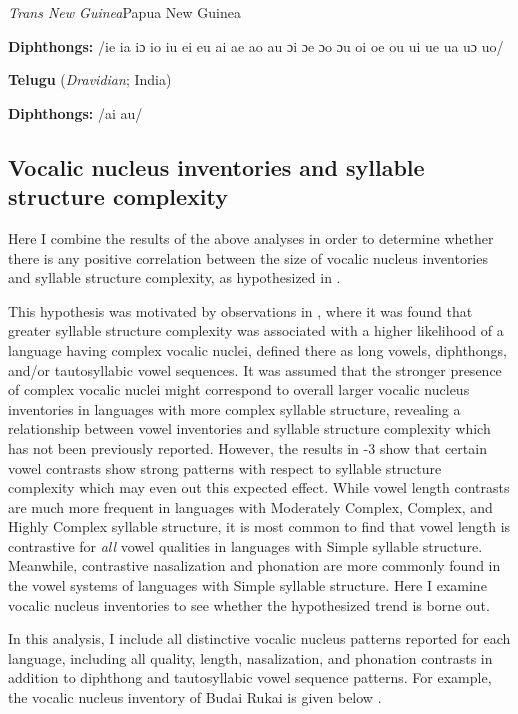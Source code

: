 \ea\label{ex:4.17}
 \textit{Trans New Guinea}{Papua New Guinea}

\textbf{Diphthongs:} /ie ia iɔ io iu ei eu ai ae ao au ɔi ɔe ɔo ɔu oi oe ou ui ue ua uɔ uo/
\z

\ea\label{ex:4.18}
  \textbf{Telugu} (\textit{Dravidian}; India)

\textbf{Diphthongs:} /ai au/
\z

\subsection{Vocalic nucleus inventories and syllable structure complexity}\label{sec:4.3.5}

  Here I combine the results of the above analyses in order to determine whether there is any positive correlation between the size of vocalic nucleus inventories and syllable structure complexity, as hypothesized in .

  This hypothesis was motivated by observations in , where it was found that greater syllable structure complexity was associated with a higher likelihood of a language having complex vocalic nuclei, defined there as long vowels, diphthongs, and/or tautosyllabic vowel sequences. It was assumed that the stronger presence of complex vocalic nuclei might correspond to overall larger vocalic nucleus inventories in languages with more complex syllable structure, revealing a relationship between vowel inventories and syllable structure complexity which has not been previously reported. However, the results in -3 show that certain vowel contrasts show strong patterns with respect to syllable structure complexity which may even out this expected effect. While vowel length contrasts are much more frequent in languages with Moderately Complex, Complex, and Highly Complex syllable structure, it is most common to find that vowel length is contrastive for \textit{all} vowel qualities in languages with Simple syllable structure. Meanwhile, contrastive nasalization and phonation are more commonly found in the vowel systems of languages with Simple syllable structure. Here I examine vocalic nucleus inventories to see whether the hypothesized trend is borne out.

  In this analysis, I include all distinctive vocalic nucleus patterns reported for each language, including all quality, length, nasalization, and phonation contrasts in addition to diphthong and tautosyllabic vowel sequence patterns. For example, the vocalic nucleus inventory of Budai Rukai is given below .

